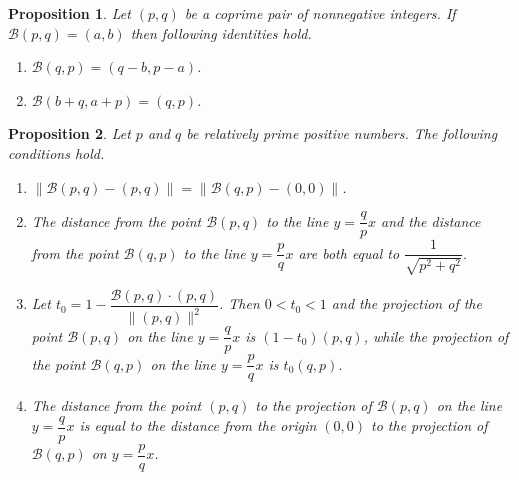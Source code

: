 \documentclass[10pt,a4paper]{amsart}
\newtheorem{proposition}{Proposition}
\newcommand{\B}{\mathcal B}
\newcommand{\F}{\mathcal F}
\begin{document}
\begin{proposition}\label{prop}
Let $(p,q)$ be a coprime pair of nonnegative integers. If $\B(p,q)=(a,b)$ then following identities hold.
    \begin{enumerate} 
    \item  $\B(q,p)=(q-b,p-a)$.
    \item  $\B(b+q,a+p)=(q,p)$.
    \end{enumerate}
\end{proposition}

\begin{proposition}\label{mainprop}
Let $p$ and $q$ be relatively prime positive numbers. The following conditions hold.
   \begin{enumerate}
    \item  $\|\B(p,q)-(p,q)\|=\|\B(q,p)-(0,0)\|$.
    \item The distance from the point $\B(p,q)$ to the line $y=\dfrac{q}{p}x$  and the distance from the point $\B(q,p)$ to the line $y=\dfrac{p}{q}x$ are both  equal to $\dfrac{1}{\sqrt{p^2+q^2}}$. 
    \item Let $t_0=1-\dfrac{\B(p,q)\cdot (p,q)}{\|(p,q)\|^2}$. Then $0<t_0<1$ and the projection of the point $\B(p,q)$ on the line $y=\dfrac{q}{p}x$ is  $(1-t_0)(p,q)$, while the projection of the point $\B(q,p)$ on the line $y=\dfrac{p}{q}x$ is $t_0(q,p)$. 
    \item The distance from the point $(p,q)$ to the projection of $\B(p,q)$ on the line $y=\dfrac{q}{p}x$ is
    equal to the distance from the origin $(0,0)$ to the projection of $\B(q,p)$  on $y=\dfrac{p}{q}x$.
    \end{enumerate}
\end{proposition}
\end{document}
